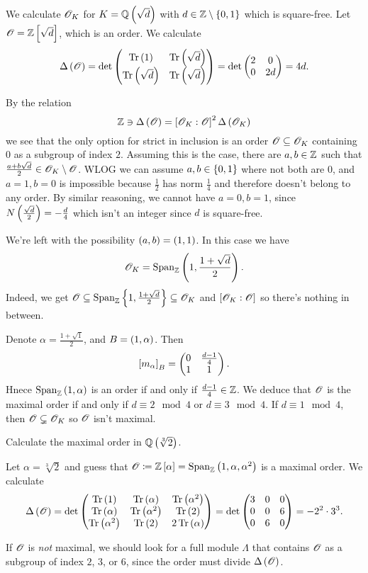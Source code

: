 \documentclass[11pt]{article}
\begin{document}
\begin{example}
We calculate $\mathcal{O}_K$ for $K = \mathbb{Q}\left( \sqrt{d} \right)$ with $d \in \mbb{Z} \setminus \set{0,1}$ which is square-free.
Let $\mathcal{O} = \mathbb{Z}\left[ \sqrt{d} \right]$, which is an order. We calculate
\[
\Delta\left( \mathcal{O} \right) = \det\begin{pmatrix}\operatorname{Tr}\left( 1 \right) & \operatorname{Tr}\left( \sqrt{d} \right) \\ \operatorname{Tr}\left( \sqrt{d} \right) & \operatorname{Tr}\left( \sqrt{d} \right)\end{pmatrix} = \det\begin{pmatrix}2 & 0 \\ 0 & 2d\end{pmatrix} = 4d \text{.}
\]

By the relation
\[\mathbb{Z} \ni \Delta\left( \mathcal{O} \right) = \left[ \mathcal{O}_K : \mathcal{O} \right]^2 \Delta\left( \mathcal{O}_K \right)\]
we see that the only option for strict in inclusion is an order $\mathcal{O} \subseteq \mathcal{O}_K$ containing $0$ as a subgroup of index $2$.
Assuming this is the case, there are $a,b \in \mathbb{Z}$ such that $\frac{a + b\sqrt{d}}{2} \in \mathcal{O}_K \setminus \mathcal{O}$. WLOG we can assume $a,b \in \set{0,1}$ where not both are $0$, and $a = 1, b = 0$ is impossible because $\frac{1}{2}$ has norm $\frac{1}{4}$ and therefore doesn't belong to any order.
By similar reasoning, we cannot have $a = 0, b = 1$, since $N\left( \frac{\sqrt{d}}{2} \right) = - \frac{d}{4}$ which isn't an integer since $d$ is square-free.

We're left with the possibility $\left( a,b \right) = \left( 1,1 \right)$. In this case we have
\[\mathcal{O}_K = \operatorname{Span}_{\mathbb{Z}}\left( 1, \frac{1 + \sqrt{d}}{2} \right) \text{.}\]
Indeed, we get $\mcal{O} \subseteq \Span_{\mbb{Z}}\set{1, \frac{1 + \sqrt{d}}{2}} \subseteq \mcal{O}_K$ and $\left[ \mathcal{O}_K : \mathcal{O} \right]$ so there's nothing in between.

Denote $\alpha = \frac{1 + \sqrt{1}}{2}$, and $B = \left( 1, \alpha \right)$. Then
\[\left[ m_\alpha \right]_B = \begin{pmatrix}0 & \frac{d-1}{4} \\ 1 & 1\end{pmatrix} \text{.}\]
Hnece $\operatorname{Span}_{\mathbb{Z}}\left( 1, \alpha \right)$ is an order if and only if $\frac{d - 1}{4} \in \mathbb{Z}$. We deduce that $\mathcal{O}$ is the maximal order if and only if $d \equiv 2 \mod{4}$ or $d \equiv 3 \mod{4}$. If $d \equiv 1 \mod{4}$, then $\mathcal{O} \subsetneq \mathcal{O}_K$ so $\mathcal{O}$ isn't maximal.
\end{example}

\begin{exercise}
Calculate the maximal order in $\mathbb{Q}\left( \sqrt[3]{2} \right)$.
\end{exercise}

\begin{solution}
Let $\alpha = \sqrt[3]{2}$ and guess that $\mathcal{O} \coloneqq \mathbb{Z}\left[ \alpha \right] = \operatorname{Span}_{\mathbb{Z}}\left( 1, \alpha, \alpha^2 \right)$ is a maximal order.
We calculate
\[\Delta\left( \mathcal{O} \right) = \det\begin{pmatrix}\operatorname{Tr}\left( 1 \right) & \operatorname{Tr}\left( \alpha \right) & \operatorname{Tr}\left( \alpha^2 \right) \\ \operatorname{Tr}\left( \alpha \right) & \operatorname{Tr}\left( \alpha^2 \right) & \operatorname{Tr}\left( 2 \right) \\ \operatorname{Tr}\left( \alpha^2 \right) & \operatorname{Tr}\left( 2 \right) & 2 \operatorname{Tr}\left( \alpha \right)\end{pmatrix} = \det \begin{pmatrix}3 & 0 & 0 \\ 0 & 0 & 6 \\ 0 & 6 & 0\end{pmatrix} = -2^2 \cdot 3^3 \text{.}\]

If $\mathcal{O}$ is \emph{not} maximal, we should look for a full module $\Lambda$ that contains $\mathcal{O}$ as a subgroup of index $2$, $3$, or $6$, since the order must divide $\Delta\left( \mathcal{O} \right)$.
\end{solution}
\end{document}
